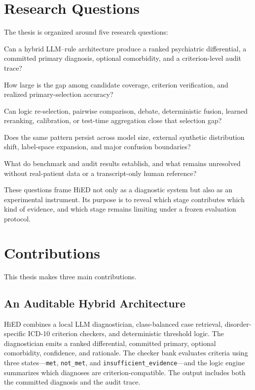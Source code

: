 \section{Research Questions}

The thesis is organized around five research questions:

\begin{description}[style=nextline,leftmargin=3cm,labelwidth=2.5cm]
\item[RQ1] Can a hybrid LLM--rule architecture produce a ranked psychiatric differential, a committed primary diagnosis, optional comorbidity, and a criterion-level audit trace?
\item[RQ2] How large is the gap among candidate coverage, criterion verification, and realized primary-selection accuracy?
\item[RQ3] Can logic re-selection, pairwise comparison, debate, deterministic fusion, learned reranking, calibration, or test-time aggregation close that selection gap?
\item[RQ4] Does the same pattern persist across model size, external synthetic distribution shift, label-space expansion, and major confusion boundaries?
\item[RQ5] What do benchmark and audit results establish, and what remains unresolved without real-patient data or a transcript-only human reference?
\end{description}

These questions frame HiED not only as a diagnostic system but also as an experimental instrument. Its purpose is to reveal which stage contributes which kind of evidence, and which stage remains limiting under a frozen evaluation protocol.

\section{Contributions}

This thesis makes three main contributions.

\subsection{An Auditable Hybrid Architecture}

HiED combines a local LLM diagnostician, class-balanced case retrieval, disorder-specific ICD-10 criterion checkers, and deterministic threshold logic. The diagnostician emits a ranked differential, committed primary, optional comorbidity, confidence, and rationale. The checker bank evaluates criteria using three states---\texttt{met}, \texttt{not\_met}, and \texttt{insufficient\_evidence}---and the logic engine summarizes which diagnoses are criterion-compatible. The output includes both the committed diagnosis and the audit trace.

